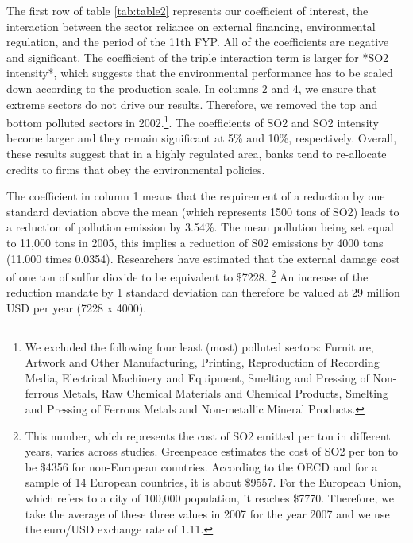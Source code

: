 \documentclass[12pt]{article}
\begin{document}
The first row of table \ref{tab:table2} represents our coefficient of interest, the interaction between the sector reliance on external financing, environmental regulation, and the period of the 11th FYP. All of the coefficients are negative and significant. The coefficient of the triple interaction term is larger for *SO2 intensity*, which suggests that the environmental performance has to be scaled down according to the production scale. In columns 2 and 4, we ensure that extreme sectors do not drive our results. Therefore, we removed the top and bottom polluted sectors in 2002.\footnote{We excluded the following four least (most) polluted sectors: Furniture, Artwork and Other Manufacturing, Printing, Reproduction of Recording Media, Electrical Machinery and Equipment, Smelting and Pressing of Non-ferrous Metals, Raw Chemical Materials and Chemical Products, Smelting and Pressing of Ferrous Metals and  Non-metallic Mineral Products.}. The coefficients of SO2 and SO2 intensity become larger and they remain significant at 5\% and 10\%, respectively. Overall, these results suggest that in a highly regulated area, banks tend to re-allocate credits to firms that obey the environmental policies.

The coefficient in column 1 means that the requirement of a  reduction by one standard deviation above the mean (which represents 1500 tons of SO2) leads to a reduction of pollution emission by 3.54\%. The mean pollution being set equal to 11,000 tons in 2005, this implies a reduction of S02 emissions by 4000 tons (11.000 times 0.0354). Researchers have estimated that the external damage cost of one ton of sulfur dioxide to be equivalent to \$7228. \footnote{This number, which represents the cost of SO2 emitted per ton in different years, varies across studies. Greenpeace estimates the cost of SO2 per ton to be \$4356 for non-European countries. According to the OECD and for a sample of  14 European countries, it is about \$9557. For the European Union, which refers to a city of 100,000 population, it reaches \$7770. Therefore, we take the average of these three values in 2007 for the year  2007 and we use the euro/USD exchange rate of 1.11. } An increase of the reduction mandate by 1 standard deviation can therefore be valued at 29 million USD per year (7228 x 4000).  
\end{document}
